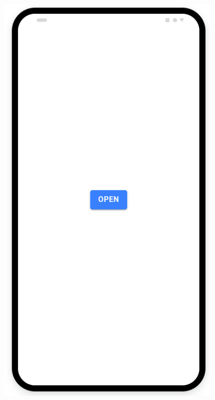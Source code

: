 \begin{figure}[H]
    \centering
    \begin{minipage}{0.25\linewidth}
        \includegraphics[scale=0.4]{Gambar/ionic-action-sheet-1.png}
        \subcaption{}
    \end{minipage}
    \begin{minipage}{0.25\linewidth}

\end{minipage}
\end{figure}
